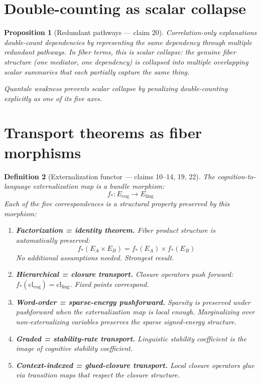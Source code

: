 \documentclass[11pt,a4paper]{article}
\newtheorem{definition}{Definition}[section]
\newtheorem{proposition}[definition]{Proposition}
\begin{document}
\section{Double-counting as scalar collapse}

\begin{proposition}[Redundant pathways --- claim 20]
\label{prop:double}
Correlation-only explanations double-count dependencies by representing
the same dependency through multiple redundant pathways. In fiber terms,
this is \emph{scalar collapse}: the genuine fiber structure (one
mediator, one dependency) is collapsed into multiple overlapping scalar
summaries that each partially capture the same thing.

Quantale weakness prevents scalar collapse by penalizing double-counting
explicitly as one of its five axes.
\end{proposition}

\section{Transport theorems as fiber morphisms}

\begin{definition}[Externalization functor --- claims 10--14, 19, 22]
The cognition-to-language externalization map is a bundle morphism:
\[
  f_*: E_{\text{cog}} \to E_{\text{ling}}
\]
Each of the five correspondences is a structural property preserved by
this morphism:

\begin{enumerate}
  \item \textbf{Factorization = identity theorem.} Fiber product structure
    is automatically preserved:
    \[
      f_*(E_A \times E_B) = f_*(E_A) \times f_*(E_B)
    \]
    No additional assumptions needed. Strongest result.

  \item \textbf{Hierarchical = closure transport.} Closure operators
    push forward: $f_*(\text{cl}_{\text{cog}}) = \text{cl}_{\text{ling}}$.
    Fixed points correspond.

  \item \textbf{Word-order = sparse-energy pushforward.} Sparsity is
    preserved under pushforward when the externalization map is local
    enough. Marginalizing over non-externalizing variables preserves
    the sparse signed-energy structure.

  \item \textbf{Graded = stability-rate transport.} Linguistic stability
    coefficient is the image of cognitive stability coefficient.

  \item \textbf{Context-indexed = glued-closure transport.} Local closure
    operators glue via transition maps that respect the closure structure.
\end{enumerate}
\end{definition}
\end{document}
